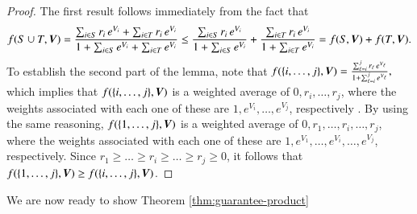 \begin{proof}
The first result follows immediately from the fact that
$$
f(S \cup T,{\bm V})
=
\frac{\sum_{i \in S} r_i {\,} e^{V_i} + \sum_{i \in T} r_i {\,} e^{V_i}}{1 + \sum_{i \in S} e^{V_i} + \sum_{i \in T} e^{V_i}}
\leq
\frac{\sum_{i \in S} r_i {\,} e^{V_i} }{1 + \sum_{i \in S} e^{V_i}}
+
\frac{\sum_{i \in T} r_i {\,} e^{V_i}}{1 + \sum_{i \in T} e^{V_i}}
= 
f(S,{\bm V}) + f(T,{\bm V}).
$$
To establish the second part of the lemma, note that
$
f(\{i,\ldots,j\} ,{\bm V})
=
\frac{\sum_{\ell=i}^j r_\ell {\,} e^{V_\ell} }{1 + \sum_{\ell=i}^j e^{V_\ell} },
$
which implies that $f(\{i,\ldots,j\} , {\bm V})$ is a weighted average of $0,r_i,\ldots,r_j$, where the weights associated with each one of these are $1,e^{V_i},\ldots,e^{V_j}$, respectively . By using the same reasoning, $f(\{1,\ldots,j\} , {\bm V})$ is a weighted average of $0,r_1,\ldots,r_i,\ldots,r_j$, where the weights associated with each one of these are $1,e^{V_1},\ldots, e^{V_i},\ldots,e^{V_j}$, respectively. Since  $r_1 \geq \ldots \geq r_i \geq \ldots \geq r_j \geq 0 $, it follows that  $f(\{1,\ldots,j\} ,{\bm V}) \geq f(\{i,\ldots,j\},{\bm V})$. %
\end{proof}

We are now ready to show Theorem \ref{thm:guarantee-product}


